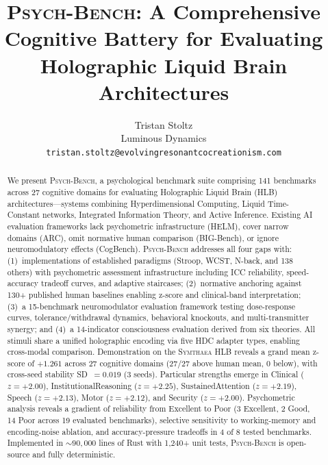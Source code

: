 \documentclass[11pt,letterpaper]{article}
\newcommand{\symthaea}{\textsc{Symthaea}}
\newcommand{\psychbench}{\textsc{Psych-Bench}}
\newcommand{\hlb}{\textsc{HLB}}
\begin{document}
\title{\psychbench{}: A Comprehensive Cognitive Battery for Evaluating\\
Holographic Liquid Brain Architectures}

\author{Tristan Stoltz\\
Luminous Dynamics\\
\texttt{tristan.stoltz@evolvingresonantcocreationism.com}}

\date{}
\maketitle

\begin{abstract}
\noindent
We present \psychbench{}, a psychological benchmark suite comprising 141 benchmarks across 27 cognitive domains for evaluating Holographic Liquid Brain (\hlb{}) architectures---systems combining Hyperdimensional Computing, Liquid Time-Constant networks, Integrated Information Theory, and Active Inference. Existing AI evaluation frameworks lack psychometric infrastructure (HELM), cover narrow domains (ARC), omit normative human comparison (BIG-Bench), or ignore neuromodulatory effects (CogBench). \psychbench{} addresses all four gaps with: (1)~implementations of established paradigms (Stroop, WCST, N-back, and 138 others) with psychometric assessment infrastructure including ICC reliability, speed-accuracy tradeoff curves, and adaptive staircases; (2)~normative anchoring against 130+ published human baselines enabling z-score and clinical-band interpretation; (3)~a 15-benchmark neuromodulator evaluation framework testing dose-response curves, tolerance/withdrawal dynamics, behavioral knockouts, and multi-transmitter synergy; and (4)~a 14-indicator consciousness evaluation derived from six theories. All stimuli share a unified holographic encoding via five HDC adapter types, enabling cross-modal comparison. Demonstration on the \symthaea{} \hlb{} reveals a grand mean z-score of $+1.261$ across 27 cognitive domains (27/27 above human mean, 0 below), with cross-seed stability SD~$= 0.019$ (3 seeds). Particular strengths emerge in Clinical ($z = +2.00$), InstitutionalReasoning ($z = +2.25$), SustainedAttention ($z = +2.19$), Speech ($z = +2.13$), Motor ($z = +2.12$), and Security ($z = +2.00$). Psychometric analysis reveals a gradient of reliability from Excellent to Poor (3 Excellent, 2 Good, 14 Poor across 19 evaluated benchmarks), selective sensitivity to working-memory and encoding-noise ablation, and accuracy-pressure tradeoffs in 4 of 8 tested benchmarks. Implemented in ${\sim}90{,}000$ lines of Rust with 1,240+ unit tests, \psychbench{} is open-source and fully deterministic.
\end{abstract}
\end{document}
